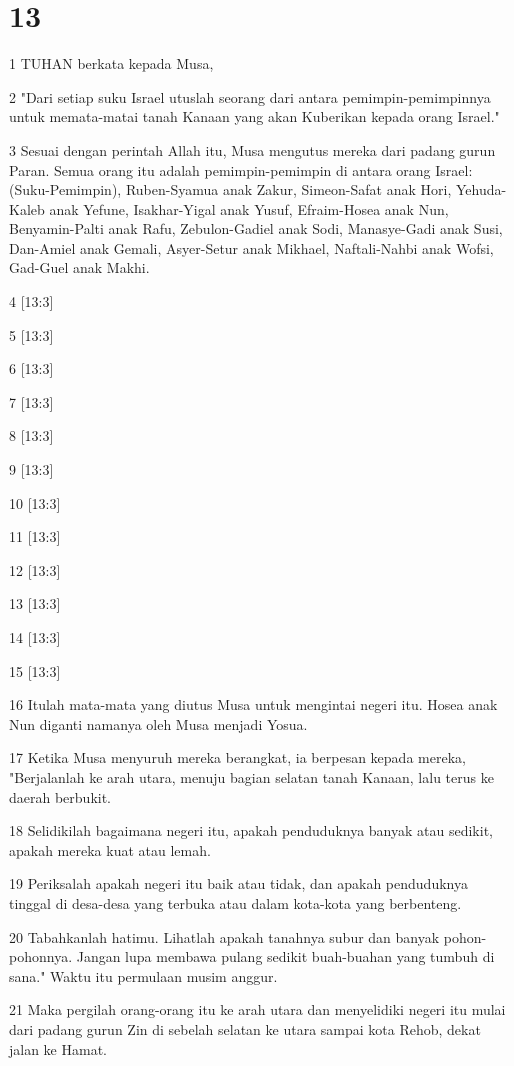 \chapter{13}

\par 1 TUHAN berkata kepada Musa,
\par 2 "Dari setiap suku Israel utuslah seorang dari antara pemimpin-pemimpinnya untuk memata-matai tanah Kanaan yang akan Kuberikan kepada orang Israel."
\par 3 Sesuai dengan perintah Allah itu, Musa mengutus mereka dari padang gurun Paran. Semua orang itu adalah pemimpin-pemimpin di antara orang Israel: (Suku-Pemimpin), Ruben-Syamua anak Zakur, Simeon-Safat anak Hori, Yehuda-Kaleb anak Yefune, Isakhar-Yigal anak Yusuf, Efraim-Hosea anak Nun, Benyamin-Palti anak Rafu, Zebulon-Gadiel anak Sodi, Manasye-Gadi anak Susi, Dan-Amiel anak Gemali, Asyer-Setur anak Mikhael, Naftali-Nahbi anak Wofsi, Gad-Guel anak Makhi.
\par 4 [13:3]
\par 5 [13:3]
\par 6 [13:3]
\par 7 [13:3]
\par 8 [13:3]
\par 9 [13:3]
\par 10 [13:3]
\par 11 [13:3]
\par 12 [13:3]
\par 13 [13:3]
\par 14 [13:3]
\par 15 [13:3]
\par 16 Itulah mata-mata yang diutus Musa untuk mengintai negeri itu. Hosea anak Nun diganti namanya oleh Musa menjadi Yosua.
\par 17 Ketika Musa menyuruh mereka berangkat, ia berpesan kepada mereka, "Berjalanlah ke arah utara, menuju bagian selatan tanah Kanaan, lalu terus ke daerah berbukit.
\par 18 Selidikilah bagaimana negeri itu, apakah penduduknya banyak atau sedikit, apakah mereka kuat atau lemah.
\par 19 Periksalah apakah negeri itu baik atau tidak, dan apakah penduduknya tinggal di desa-desa yang terbuka atau dalam kota-kota yang berbenteng.
\par 20 Tabahkanlah hatimu. Lihatlah apakah tanahnya subur dan banyak pohon-pohonnya. Jangan lupa membawa pulang sedikit buah-buahan yang tumbuh di sana." Waktu itu permulaan musim anggur.
\par 21 Maka pergilah orang-orang itu ke arah utara dan menyelidiki negeri itu mulai dari padang gurun Zin di sebelah selatan ke utara sampai kota Rehob, dekat jalan ke Hamat.
